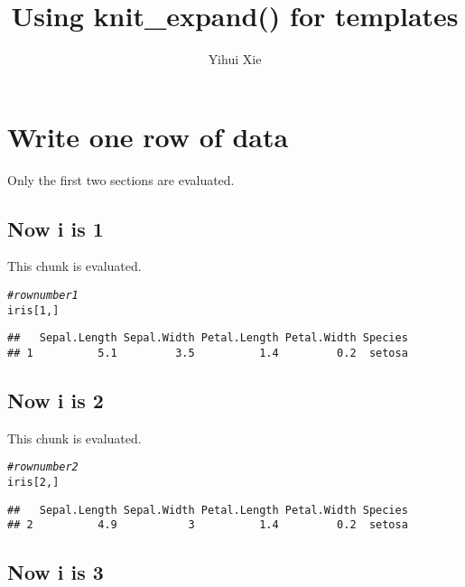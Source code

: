 \documentclass{article}\usepackage[]{graphicx}\usepackage[]{color}
\title{Using knit\_expand() for templates}
\author{Yihui Xie}
\makeatletter
\newcommand{\hlnum}[1]{\textcolor[rgb]{0.686,0.059,0.569}{#1}}%
\newcommand{\hlcom}[1]{\textcolor[rgb]{0.678,0.584,0.686}{\textit{#1}}}%
\newcommand{\hlstd}[1]{\textcolor[rgb]{0.345,0.345,0.345}{#1}}%
\newenvironment{kframe}{%
 \def\at@end@of@kframe{}%
 \ifinner\ifhmode%
  \def\at@end@of@kframe{\end{minipage}}%
  \begin{minipage}{\columnwidth}%
 \fi\fi%
 \def\FrameCommand##1{\hskip\@totalleftmargin \hskip-\fboxsep
 \colorbox{shadecolor}{##1}\hskip-\fboxsep
     \hskip-\linewidth \hskip-\@totalleftmargin \hskip\columnwidth}%
 \MakeFramed {\advance\hsize-\width
   \@totalleftmargin\z@ \linewidth\hsize
   \@setminipage}}%
 {\par\unskip\endMakeFramed%
 \at@end@of@kframe}
\newenvironment{knitrout}{}{} %
\makeatother
\begin{document}
\maketitle
\tableofcontents

\section{Write one row of data}
Only the first two sections are evaluated.



\subsection{Now i is 1}

This chunk is evaluated.
\begin{knitrout}
\color{fgcolor}\begin{kframe}
\begin{alltt}
\hlcom{# row number 1}
\hlstd{iris[}\hlnum{1}\hlstd{, ]}
\end{alltt}
\begin{verbatim}
##   Sepal.Length Sepal.Width Petal.Length Petal.Width Species
## 1          5.1         3.5          1.4         0.2  setosa
\end{verbatim}
\end{kframe}
\end{knitrout}

\subsection{Now i is 2}

This chunk is evaluated.
\begin{knitrout}
\color{fgcolor}\begin{kframe}
\begin{alltt}
\hlcom{# row number 2}
\hlstd{iris[}\hlnum{2}\hlstd{, ]}
\end{alltt}
\begin{verbatim}
##   Sepal.Length Sepal.Width Petal.Length Petal.Width Species
## 2          4.9           3          1.4         0.2  setosa
\end{verbatim}
\end{kframe}
\end{knitrout}

\subsection{Now i is 3}
\end{document}
